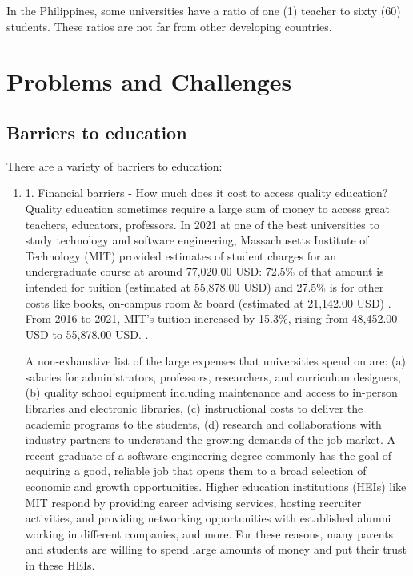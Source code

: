 \documentclass[journal, onecolumn]{IEEEtran}
\begin{document}
In the Philippines, some universities have a ratio of one (1) teacher to sixty (60)
students. These ratios are not far from other developing countries.

\section{Problems and Challenges} 
\label{sec:problems_challenges}

\subsection{Barriers to education}

There are a variety of barriers to education:

\begin{enumerate}
  \item 1. Financial barriers - How much does it cost to access quality education?
  Quality education sometimes require a large sum of 
  money to access great teachers, educators, professors. In  2021 at one of the best universities to study 
  technology and software engineering, Massachusetts Institute of Technology (MIT) provided estimates of student 
  charges for an undergraduate course at around 77,020.00 USD: 72.5\% of that amount is intended for tuition 
  (estimated at 55,878.00 USD) and 27.5\% is for other costs like books, on-campus room \& board (estimated at 21,142.00 USD) \cite{b8}.
  From 2016 to 2021, MIT's tuition increased by 15.3\%, rising from 48,452.00 USD to 55,878.00 USD. \cite{b8}.
  
  A non-exhaustive list of the large expenses that universities spend on are: (a) salaries for administrators, professors, researchers, 
  and curriculum designers, (b) quality school equipment including maintenance and access to in-person libraries 
  and electronic libraries, (c) instructional costs to deliver the academic programs to the students, (d) 
  research and collaborations with industry partners to understand the growing demands of the job market. 
  A recent graduate of a software engineering degree commonly has the goal of acquiring a good, reliable job that 
  opens them to a broad selection of economic and growth opportunities.
  Higher education institutions (HEIs) like MIT respond by providing career advising services, hosting recruiter activities, and
  providing networking opportunities with established alumni working in different companies, and more.  
  For these reasons, many parents and students are willing to spend large amounts of money and 
  put their trust in these HEIs.


\end{enumerate}
\end{document}
